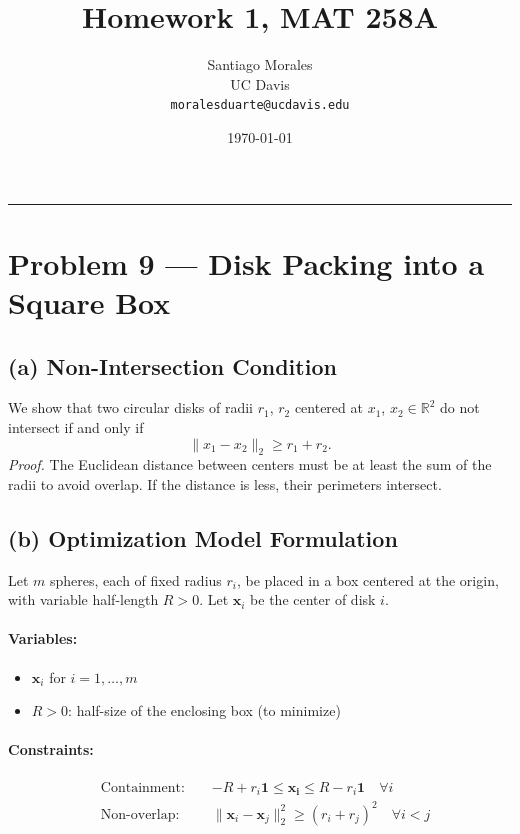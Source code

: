 \documentclass[11pt]{article}
\title{\vspace{-1cm} \textbf{Homework 1, MAT 258A}}
\author{Santiago Morales \\ UC Davis \\ \texttt{moralesduarte@ucdavis.edu}}
\date{\today}
\begin{document}
\maketitle
\vspace{-1em}
\hrule
\vspace{1em}

\section*{Problem 9 — Disk Packing into a Square Box}

\subsection*{(a) Non-Intersection Condition}

We show that two circular disks of radii $r_1$, $r_2$ centered at $x_1$, $x_2 \in \mathbb{R}^2$ do not intersect if and only if
\[
\|x_1 - x_2\|_2 \geq r_1 + r_2.
\]
\textit{Proof.} The Euclidean distance between centers must be at least the sum of the radii to avoid overlap. If the distance is less, their perimeters intersect.

\subsection*{(b) Optimization Model Formulation}

Let $m$ spheres, each of fixed radius $r_i$, be placed in a box centered at the origin, with variable half-length $R > 0$. Let $\mathbf{x}_i$ be the center of disk $i$.

\paragraph{Variables:}
\begin{itemize}[noitemsep]
    \item $\mathbf{x}_i$ for $i = 1, \dots, m$
    \item $R > 0$: half-size of the enclosing box (to minimize)
\end{itemize}

\paragraph{Constraints:}
\begin{align*}
    & \text{Containment: } && -R + r_i\mathbf{1} \leq \mathbf{x_i} \leq R - r_i\mathbf{1}  \quad \forall i \\
    & \text{Non-overlap: } && \|\mathbf{x}_i - \mathbf{x}_j\|_2^2 \geq (r_i + r_j)^2 \quad \forall i < j
\end{align*}
\end{document}
